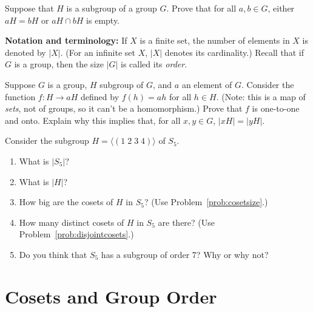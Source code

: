 \begin{problem}\label{prob:disjointcosets}
Suppose that \(H\) is a subgroup of a group \(G\). Prove that for all \(a,b\in G\), either \(aH = bH\) or \(aH \cap bH\) is empty.
\begin{annotation}
\end{annotation}
\end{problem}

\textbf{Notation and terminology:} If \(X\) is a finite set, the number of elements in \(X\) is denoted by \(\lvert X \rvert\). (For an infinite set \(X\), \(\lvert X\rvert\) denotes its cardinality.) Recall that if \(G\) is a group, then the size \(\lvert G\rvert\) is called its \emph{order}.

\begin{problem}\label{prob:cosetsize}
Suppose \(G\) is a group, \(H\) subgroup of \(G\), and \(a\) an element of \(G\). Consider the function \(f : H \longrightarrow aH\) defined by \(f(h) = ah\) for all \(h \in H\). (Note: this is a map of \emph{sets}, not of groups, so it can't be a homomorphism.) Prove that \(f\) is one-to-one and onto. Explain why this implies that, for all  \(x,y\in G\), \(\lvert xH \rvert = \lvert yH \rvert\).
\end{problem}

\begin{problem}
Consider the subgroup \(H=\langle (1\;2\;3\;4) \rangle \) of \(S_5\).
\begin{enumerate}
  \item What is \(\lvert S_5 \rvert \)?
  \item What is \( \lvert H \rvert \)?
  \item How big are the cosets of \(H\) in \(S_5\)? (Use Problem~\ref{prob:cosetsize}.)
  \item How many distinct cosets of \(H\) in \(S_5\) are there? (Use Problem~\ref{prob:disjointcosets}.)
  \item Do you think that \(S_5\) has a subgroup of order 7? Why or why not?
\end{enumerate}
\end{problem}

\section{Cosets and Group Order}

